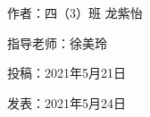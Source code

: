 \vspace{10pt}



作者：四（3）班 龙紫怡



指导老师：徐美玲



投稿：2021年5月21日



发表：2021年5月24日


















                



\vspace{10pt}

\hline



